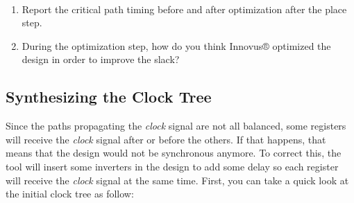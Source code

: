 	\begin{exercise}\
	\vspace{-6mm}
	\begin{enumerate}
		\item Report the critical path timing before and after optimization after the place step.
		\item During the optimization step, how do you think Innovus® optimized the design in order to improve the slack?
	\end{enumerate}
	\vspace{-5mm}
\end{exercise}
\clearpage

\subsection{Synthesizing the Clock Tree}
Since the paths propagating the \textit{clock} signal are not all balanced, some registers will receive the \textit{clock} signal after or before the others. If that happens, that means that the design would not be synchronous anymore. To correct this, the tool will insert some inverters in the design to add some delay so each register will receive the \textit{clock} signal at the same time. First, you can take a quick look at the initial clock tree as follow:


